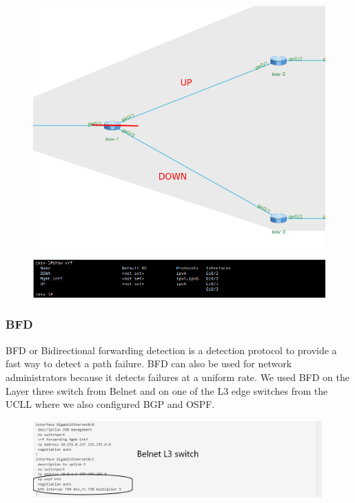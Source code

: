 \documentclass{article}
\begin{document}
\begin{figure}[H]
	\centering
	\includegraphics[width=\textwidth]{images/Vrf.png}
\end{figure}

\begin{figure}[H]
	\centering
	\includegraphics[width=\textwidth]{images/Vrf_show.png}
\end{figure}


\newpage
\subsubsection{BFD}
BFD or Bidirectional forwarding detection is a detection protocol to provide a fast way to detect a path failure. BFD can also be used for network administrators because it detects failures at a uniform rate.
We used BFD on the Layer three switch from Belnet and on one of the L3 edge switches from the UCLL where we also configured BGP and OSPF.

\begin{figure}[H]
	\centering
	\includegraphics[width=\textwidth]{images/Bfd.png}
\end{figure}
\end{document}
